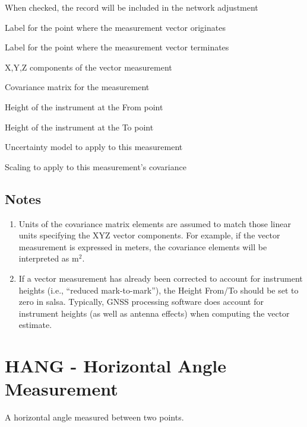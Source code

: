 \begin{description}[leftmargin=!,labelwidth=\widthof{\bfseries Height From2:}]
\item[Enabled:] When checked, the record will be included in the network adjustment
\item[From:] Label for the point where the measurement vector originates
\item[To:] Label for the point where the measurement vector terminates
\item[Delta X,Y,Z:] X,Y,Z components of the vector measurement
\item[Covariance\textsuperscript{1}:] Covariance matrix for the measurement
\item[Height From\textsuperscript{2}:] Height of the instrument at the From point
\item[Height To:] Height of the instrument at the To point
\item[Uncertainty:] Uncertainty model to apply to this measurement
\item[Scaling:] Scaling to apply to this measurement's covariance
\end{description}

\subsection*{Notes}
\begin{enumerate}
\item Units of the covariance matrix elements are assumed to match those linear units specifying the XYZ vector components.  For example, if the vector measurement is expressed in meters, the covariance elements will be interpreted as $\mathrm{m}^2$.
\item If a vector measurement has already been corrected to account for instrument heights (i.e., ``reduced mark-to-mark''), the Height From/To should be set to zero in \textsf{salsa}.  Typically, GNSS processing software does account for instrument heights (as well as antenna effects) when computing the vector estimate.
\end{enumerate}


\newpage
\section{HANG - Horizontal Angle Measurement}

A horizontal angle measured between two points.

